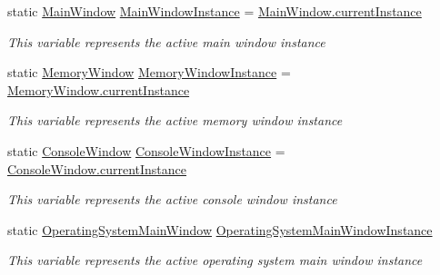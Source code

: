 \begin{DoxyCompactItemize}
\item 
static \hyperlink{class_c_p_u___o_s___simulator_1_1_main_window}{Main\+Window} \hyperlink{class_c_p_u___o_s___simulator_1_1_window_bridge_1_1_window_instances_a130a2c32e8ccfd51a42ecb363fbb42cc}{Main\+Window\+Instance} = \hyperlink{class_c_p_u___o_s___simulator_1_1_main_window_a1280266cc57403a91f08a8350dee05cc}{Main\+Window.\+current\+Instance}
\begin{DoxyCompactList}\small\item\em This variable represents the active main window instance \end{DoxyCompactList}\item 
static \hyperlink{class_c_p_u___o_s___simulator_1_1_memory_window}{Memory\+Window} \hyperlink{class_c_p_u___o_s___simulator_1_1_window_bridge_1_1_window_instances_a401fd485bde830472a1a960a25ec1464}{Memory\+Window\+Instance} = \hyperlink{class_c_p_u___o_s___simulator_1_1_memory_window_a870b795e3b919a82888ad608ab24d61a}{Memory\+Window.\+current\+Instance}
\begin{DoxyCompactList}\small\item\em This variable represents the active memory window instance \end{DoxyCompactList}\item 
static \hyperlink{class_c_p_u___o_s___simulator_1_1_console_window}{Console\+Window} \hyperlink{class_c_p_u___o_s___simulator_1_1_window_bridge_1_1_window_instances_a90b746b2373f150cab75e4dee0f91c45}{Console\+Window\+Instance} = \hyperlink{class_c_p_u___o_s___simulator_1_1_console_window_abee2fd1e118dd4f81dc2142bc033da4a}{Console\+Window.\+current\+Instance}
\begin{DoxyCompactList}\small\item\em This variable represents the active console window instance \end{DoxyCompactList}\item 
static \hyperlink{class_c_p_u___o_s___simulator_1_1_operating_system_main_window}{Operating\+System\+Main\+Window} \hyperlink{class_c_p_u___o_s___simulator_1_1_window_bridge_1_1_window_instances_a151a9fa30e40800129d05845501f7b64}{Operating\+System\+Main\+Window\+Instance}
\begin{DoxyCompactList}\small\item\em This variable represents the active operating system main window instance \end{DoxyCompactList}\end{DoxyCompactItemize}


